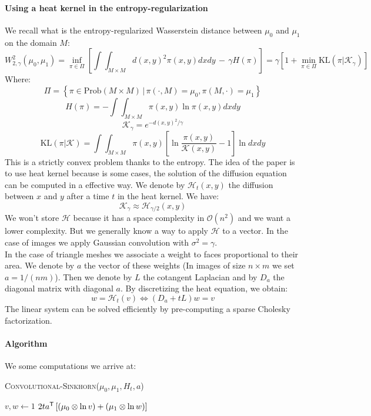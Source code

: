 \paragraph{Using a heat kernel in the entropy-regularization}
We recall what is the entropy-regularized Wasserstein distance between $\mu_0$ and $\mu_1$ on the domain $M$:
$$ W_{2, \gamma}^2(\mu_0, \mu_1) = \inf_{\pi \in \Pi} \left[ \int \int_{M \times M} d(x, y)^2 \pi(x, y) dx dy \, - \, \gamma H(\pi) \right] = \gamma \left[ 1 + \min_{\pi \in \Pi} \text{KL}(\pi | \mathcal{K}_\gamma) \right]$$
Where:
$$ \Pi = \left\{ \pi \in \text{Prob}(M \times M) \, | \, \pi(\cdot, M) = \mu_0, \pi(M, \cdot) = \mu_1 \right\} $$
$$ H(\pi) = - \int \int_{M \times M} \pi(x, y) \ln \pi(x, y) dx dy $$
$$ \mathcal{K}_\gamma = e^{-d(x, y)^2 / \gamma} $$
$$ \text{KL}(\pi | \mathcal{K}) = \int \int_{M \times M} \pi(x, y) \left[ \ln \dfrac{\pi(x, y)}{\mathcal{K}(x, y)} - 1 \right]\ln  dx dy $$
This is a strictly convex problem thanks to the entropy. The idea of the paper is to use heat kernel because is some cases, the solution of the diffusion equation can be computed in a effective way. We denote by $\mathcal{H}_t(x, y)$ the diffusion between $x$ and $y$ after a time $t$ in the heat kernel. We have:
$$ \mathcal{K}_\gamma \approx \mathcal{H}_{\gamma / 2}(x, y) $$
We won't store $\mathcal{H}$ because it has a space complexity in $\mathcal{O}(n^2)$ and we want a lower complexity. But we generally know a way to apply $\mathcal{H}$ to a vector. In the case of images we apply Gaussian convolution with $\sigma^2 = \gamma$. \\
In the case of triangle meshes we associate a weight to faces proportional to their area. We denote by $a$ the vector of these weights (In images of size $n \times m$ we set $a = 1 / (nm)$). Then we denote by $L$ the cotangent Laplacian and by $D_a$ the diagonal matrix with diagonal $a$. By discretizing the heat equation, we obtain:
$$ w = \mathcal{H}_t(v) \Leftrightarrow \left( D_a + t L \right) w = v $$
The linear system can be solved efficiently by pre-computing a sparse Cholesky factorization.

\paragraph{Algorithm}
We some computations we arrive at:

\vspace{3mm}
\begin{algorithm}[H]
	\caption{\textsc{Convolutional-Sinkhorn}($\mu_0, \mu_1, H_t, a$)}
	$v, w \gets 1$ \;
	\Return $2t a^{\mathsf{T}} \left[ \left( \mu_0 \otimes \ln v \right) + \left( \mu_1 \otimes \ln w \right) \right]$
\end{algorithm}
\vspace{3mm}

